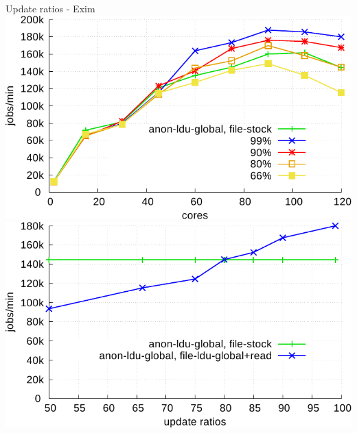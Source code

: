 \documentclass[english]{beamer} %
\begin{document}
\begin{frame}{Update ratios - Exim}
\includegraphics[scale=0.4]{graph/ratio_exim_core}
\includegraphics[scale=0.4]{graph/ratio_exim}
\end{frame}
\end{document}
